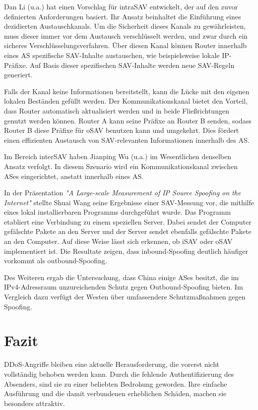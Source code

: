 \documentclass[sigplan,screen]{acmart}
\begin{document}
Dan Li (u.a.) \cite{intraSAVNET01} hat einen Vorschlag für intraSAV entwickelt, der auf den zuvor definierten Anforderungen basiert. Ihr Ansatz beinhaltet die Einführung eines dezidierten Austauschkanals. Um die Sicherheit dieses Kanals zu gewährleisten, muss dieser immer vor dem Austausch verschlüsselt werden, und zwar durch ein sicheres Verschlüsselungsverfahren. Über diesen Kanal können Router innerhalb eines AS spezifische SAV-Inhalte austauschen, wie beispielsweise lokale IP-Präfixe. Auf Basis dieser spezifischen SAV-Inhalte werden neue SAV-Regeln generiert.

Falls der Kanal keine Informationen bereitstellt, kann die Lücke mit den eigenen lokalen Beständen gefüllt werden. Der Kommunikationskanal bietet den Vorteil, dass Router automatisch aktualisiert werden und in beide Fließrichtungen genutzt werden können. Router A kann seine Präfixe an Router B senden, sodass Router B diese Präfixe für oSAV benutzen kann und umgekehrt. Dies fördert einen effizienten Austausch von SAV-relevanten Informationen innerhalb des AS.

Im Bereich interSAV haben Jianping Wu (u.a.) \cite{interSAVNET01} im Wesentlichen denselben Ansatz verfolgt. In diesem Szenario wird ein Kommunikationskanal zwischen ASes eingerichtet, anstatt innerhalb eines AS.

In der Präsentation \textit{"A Large-scale Measurement of
IP Source Spoofing on the Internet"} stellte Shuai Wang \cite{largemeasurment01} seine Ergebnisse einer SAV-Messung vor, die mithilfe eines lokal installierbaren Programms durchgeführt wurde. Das Programm etabliert eine Verbindung zu einem speziellen Server. Dabei sendet der Computer gefälschte Pakete an den Server und der Server sendet ebenfalls gefälschte Pakete an den Computer. Auf diese Weise lässt sich erkennen, ob iSAV oder oSAV implementiert ist. Die Resultate zeigen, dass inbound-Spoofing deutlich häufiger vorkommt als outbound-Spoofing.

Des Weiteren ergab die Untersuchung, dass China einige ASes besitzt, die im IPv4-Adressraum unzureichenden Schutz gegen Outbound-Spoofing bieten. Im Vergleich dazu verfügt der Westen über umfassendere Schutzmaßnahmen gegen Spoofing.

\section{Fazit}
DDoS-Angriffe bleiben eine aktuelle Herausforderung, die vorerst nicht vollständig behoben werden kann. Durch die fehlende Authentifizierung des Absenders, sind sie zu einer beliebten Bedrohung geworden. Ihre einfache Ausführung und die damit verbundenen erheblichen Schäden, machen sie besonders attraktiv.
\end{document}
